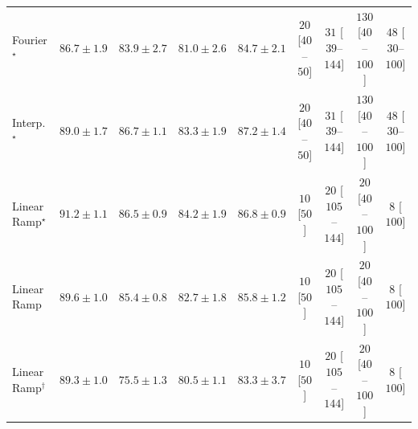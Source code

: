 \begin{tabular}{l|cccc|cccc|}
Fourier$^\star$ & {\cellcolor[HTML]{005E33}} \color[HTML]{F1F1F1} $86.7\pm 1.9$ & {\cellcolor[HTML]{066D39}} \color[HTML]{F1F1F1} $83.9\pm 2.7$ & {\cellcolor[HTML]{15793E}} \color[HTML]{F1F1F1} $81.0\pm 2.6$ & {\cellcolor[HTML]{016937}} \color[HTML]{F1F1F1} $84.7\pm 2.1$ & {\cellcolor[HTML]{FFF4F0}} \color[HTML]{000000} $20$ [$40$--$50$] & {\cellcolor[HTML]{FFF2EE}} \color[HTML]{000000} $31$ [$39$--$144$] & {\cellcolor[HTML]{FDDBD7}} \color[HTML]{000000} $130$ [$40$--$100$] & {\cellcolor[HTML]{FEEEEB}} \color[HTML]{000000} $48$ [$30$--$100$] \\
Interp.$^\star$ & {\cellcolor[HTML]{00522E}} \color[HTML]{F1F1F1} $89.0\pm 1.7$ & {\cellcolor[HTML]{005E33}} \color[HTML]{F1F1F1} $86.7\pm 1.1$ & {\cellcolor[HTML]{096F3A}} \color[HTML]{F1F1F1} $83.3\pm 1.9$ & {\cellcolor[HTML]{005C32}} \color[HTML]{F1F1F1} $87.2\pm 1.4$ & {\cellcolor[HTML]{FFF4F0}} \color[HTML]{000000} $20$ [$40$--$50$] & {\cellcolor[HTML]{FFF2EE}} \color[HTML]{000000} $31$ [$39$--$144$] & {\cellcolor[HTML]{FDDBD7}} \color[HTML]{000000} $130$ [$40$--$100$] & {\cellcolor[HTML]{FEEEEB}} \color[HTML]{000000} $48$ [$30$--$100$] \\
Linear Ramp$^\star$ & {\cellcolor[HTML]{004629}} \color[HTML]{F1F1F1} $91.2\pm 1.1$ & {\cellcolor[HTML]{005F34}} \color[HTML]{F1F1F1} $86.5\pm 0.9$ & {\cellcolor[HTML]{056C39}} \color[HTML]{F1F1F1} $84.2\pm 1.9$ & {\cellcolor[HTML]{005E33}} \color[HTML]{F1F1F1} $86.8\pm 0.9$ & {\cellcolor[HTML]{FFF7F3}} \color[HTML]{000000} $10$ [$50$] & {\cellcolor[HTML]{FFF4F0}} \color[HTML]{000000} $20$ [$105$--$144$] & {\cellcolor[HTML]{FFF4F0}} \color[HTML]{000000} $20$ [$40$--$100$] & {\cellcolor[HTML]{FFF7F3}} \color[HTML]{000000} $8$ [$100$] \\
Linear Ramp & {\cellcolor[HTML]{004F2D}} \color[HTML]{F1F1F1} $89.6\pm 1.0$ & {\cellcolor[HTML]{006636}} \color[HTML]{F1F1F1} $85.4\pm 0.8$ & {\cellcolor[HTML]{0C723B}} \color[HTML]{F1F1F1} $82.7\pm 1.8$ & {\cellcolor[HTML]{006435}} \color[HTML]{F1F1F1} $85.8\pm 1.2$ & {\cellcolor[HTML]{FFF7F3}} \color[HTML]{000000} $10$ [$50$] & {\cellcolor[HTML]{FFF4F0}} \color[HTML]{000000} $20$ [$105$--$144$] & {\cellcolor[HTML]{FFF4F0}} \color[HTML]{000000} $20$ [$40$--$100$] & {\cellcolor[HTML]{FFF7F3}} \color[HTML]{000000} $8$ [$100$] \\
Linear Ramp$^\dagger$ & {\cellcolor[HTML]{00512E}} \color[HTML]{F1F1F1} $89.3\pm 1.0$ & {\cellcolor[HTML]{30954F}} \color[HTML]{F1F1F1} $75.5\pm 1.3$ & {\cellcolor[HTML]{187B3F}} \color[HTML]{F1F1F1} $80.5\pm 1.1$ & {\cellcolor[HTML]{096F3A}} \color[HTML]{F1F1F1} $83.3\pm 3.7$ & {\cellcolor[HTML]{FFF7F3}} \color[HTML]{000000} $10$ [$50$] & {\cellcolor[HTML]{FFF4F0}} \color[HTML]{000000} $20$ [$105$--$144$] & {\cellcolor[HTML]{FFF4F0}} \color[HTML]{000000} $20$ [$40$--$100$] & {\cellcolor[HTML]{FFF7F3}} \color[HTML]{000000} $8$ [$100$] \\

\end{tabular}
